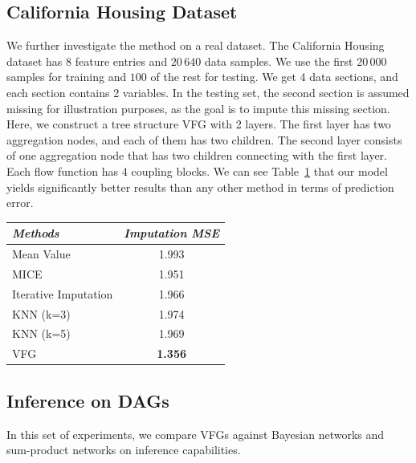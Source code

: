 \documentclass{article}
\begin{document}
\subsection{California Housing Dataset}
We further investigate the method on a real dataset.  
The California Housing dataset  has 8 feature entries and $20\,640$ data samples. 
We use the first $20\,000$ samples for training  and $100$ of the rest for testing.  
We get  4 data sections, and each section contains 2 variables. 
In the testing set, the second section is assumed missing for illustration purposes, as the goal is to impute this missing section.
Here, we construct a tree structure VFG with 2 layers. 
The first layer has two aggregation nodes, and each of them has two children. 
The second layer consists of one aggregation node that has two children connecting with the first layer.  
Each flow function has 4 coupling blocks. 
We can see Table~\ref{tab:imp_arrhytmia} that our model yields significantly better results than any other method in terms of prediction error. 
\begin{table}[ht]
\centering
 \begin{tabular}{l | c  }\hline
\textit{Methods} & \textit{Imputation MSE}  \\
\hline
Mean Value &1.993 \\
MICE & 1.951\\
Iterative Imputation & 1.966\\
KNN (k=3) &1.974 \\
KNN (k=5) &1.969 \\
\hline
VFG & \textbf{1.356} \\  
\hline
\end{tabular}
 \label{tab:imp_arrhytmia}
\end{table}


 
\subsection{Inference on DAGs}
In this set of experiments, we compare VFGs against Bayesian networks and sum-product networks on inference capabilities. 
\end{document}
